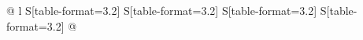 
\begin{table}[!htbp]
    \centering
    \caption{}
    \label{tbl:errormetricsquadtfce}
    \begin{tabular}{@{} l S[table-format=3.2] S[table-format=3.2] S[table-format=3.2] S[table-format=3.2] @{}}

\end{tabular}
\end{table}
